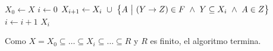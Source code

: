 \documentclass[preview]{standalone}
\begin{document}
\begin{algorithmic}
\State $X_0\gets X$
\State $i \gets 0$
\Repeat  
	\State $X_{i+1}\gets X_i \text{ } \cup \text{ } \big\{A\text{ } \big{|} \text{ } (Y\rightarrow Z) \in F\text{ } \wedge \text{ } Y \subseteq X_i \text{ } \wedge \text{ } A\in Z \big\}$
	\State $i \gets i+1$
\State \Return $X_i$
\EndFunction
\end{algorithmic}

\vspace{.5cm}

Como $X = X_0  \subseteq \dots \subseteq X_i  \subseteq \dots \subseteq R$ y $R$ es finito, el algoritmo termina.
\end{document}
